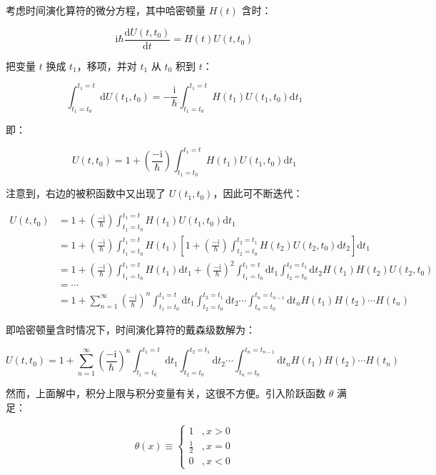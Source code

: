 
考虑时间演化算符的微分方程，其中哈密顿量 $H(t) $ 含时：

$$
\mathrm{i}\hbar\frac{\mathrm{d}U(t,t_0) }{\mathrm{d}t }
=H(t) U(t,t_0) ~
$$

把变量 $t $ 换成 $t_1 $，移项，并对 $t_1 $ 从 $t_0 $ 积到 $t $：

$$
\int_{t_1=t_0}^{t_1=t} \mathrm{d}U(t_1,t_0)
=-\frac{\mathrm{i} }{\hbar } \int_{t_1=t_0}^{t_1=t} H(t_1) U(t_1,t_0)\mathrm{d}t_1~
$$

即：

$$
U(t,t_0)
=1 + \left(\frac{-\mathrm{i} }{\hbar }  \right) \int_{t_1=t_0}^{t_1=t} H(t_1) U(t_1,t_0)\mathrm{d}t_1~
$$

注意到，右边的被积函数中又出现了 $U(t_1,t_0) $，因此可不断迭代：

$$
\begin{aligned}
U(t,t_0)
&=1 + \left(\frac{-\mathrm{i} }{\hbar }  \right) \int_{t_1=t_0}^{t_1=t} H(t_1) U(t_1,t_0)\mathrm{d}t_1 \\
&=1 + \left(\frac{-\mathrm{i} }{\hbar }  \right) \int_{t_1=t_0}^{t_1=t} H(t_1) \left[1 + \left(\frac{-\mathrm{i} }{\hbar }  \right) \int_{t_2=t_0}^{t_2=t_1} H(t_2) U(t_2,t_0)\mathrm{d}t_2 \right]\mathrm{d}t_1 \\
&=1 + \left(\frac{-\mathrm{i} }{\hbar }  \right) \int_{t_1=t_0}^{t_1=t} H(t_1)\mathrm{d}t_1 + \left(\frac{-\mathrm{i} }{\hbar }  \right)^2 \int_{t_1=t_0}^{t_1=t}\mathrm{d}t_1 \int_{t_2=t_0}^{t_2=t_1}\mathrm{d}t_2 H(t_1)H(t_2)U(t_2,t_0) \\
&=\cdots \\
&=1 + \sum_{n=1}^{\infty} \left(\frac{-\mathrm{i} }{\hbar }  \right)^n \int_{t_1=t_0}^{t_1=t}\mathrm{d}t_1 \int_{t_2=t_0}^{t_2=t_1}\mathrm{d}t_2 \cdots \int_{t_n=t_0}^{t_n=t_{n-1}}\mathrm{d}t_n H(t_1)H(t_2) \cdots H(t_n)
\end{aligned}~
$$

即哈密顿量含时情况下，时间演化算符的戴森级数解为：

$$
U(t,t_0)
=1 + \sum_{n=1}^{\infty} \left(\frac{-\mathrm{i} }{\hbar }  \right)^n \int_{t_1=t_0}^{t_1=t}\mathrm{d}t_1 \int_{t_2=t_0}^{t_2=t_1}\mathrm{d}t_2 \cdots \int_{t_n=t_0}^{t_n=t_{n-1}}\mathrm{d}t_n H(t_1)H(t_2) \cdots H(t_n)~
$$

然而，上面解中，积分上限与积分变量有关，这很不方便。引入阶跃函数 $\theta $ 满足：

$$
\theta(x)
\equiv \left\{
\begin{aligned}
1&,x>0 \\
\frac{1 }{2 }&,x=0 \\
0&,x<0
\end{aligned}
\right.~
$$

